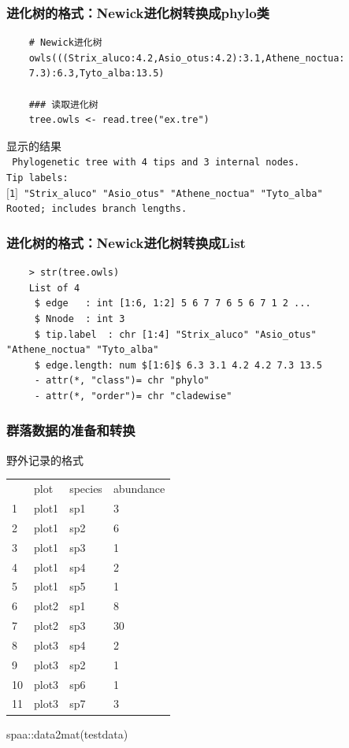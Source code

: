 \documentclass[UTF8]{ctexbeamer}
\begin{document}
    \begin{frame}[fragile]
    \frametitle{进化树的格式：Newick进化树转换成phylo类}
    \begin{verbatim}
    # Newick进化树
    owls(((Strix_aluco:4.2,Asio_otus:4.2):3.1,Athene_noctua:
    7.3):6.3,Tyto_alba:13.5)
    
    ### 读取进化树
    tree.owls <- read.tree("ex.tre")
    \end{verbatim}
    
    显示的结果\\
    {\tt 
    Phylogenetic tree with 4 tips and 3 internal nodes.\\
    
    Tip labels:\\
    $[$1$]$ "Strix\_aluco"   "Asio\_otus" "Athene\_noctua" "Tyto\_alba"   \\ 
    
    Rooted; includes branch lengths.}\\
    
    \end{frame}
    
    \begin{frame}[fragile]
    \frametitle{进化树的格式：Newick进化树转换成List}
     \begin{verbatim}
    > str(tree.owls)
    List of 4
     $ edge   : int [1:6, 1:2] 5 6 7 7 6 5 6 7 1 2 ...
     $ Nnode  : int 3
     $ tip.label  : chr [1:4] "Strix_aluco" "Asio_otus" "Athene_noctua" "Tyto_alba"
     $ edge.length: num $[1:6]$ 6.3 3.1 4.2 4.2 7.3 13.5
     - attr(*, "class")= chr "phylo"
     - attr(*, "order")= chr "cladewise"
    \end{verbatim}
    \end{frame}
    

\begin{frame}
\frametitle{群落数据的准备和转换}
野外记录的格式
 \begin{center}
\begin{tabular}{llll} 
&plot & species &  abundance\\
1& plot1 &  sp1&3\\
2& plot1 &  sp2&6\\
3& plot1 &  sp3&1\\
4& plot1 &  sp4&2\\
5& plot1 &  sp5&1\\
6& plot2 &  sp1&8\\
7& plot2 &  sp3&   30\\
8& plot3 &  sp4&2\\
9& plot3 &  sp2&1\\
10   & plot3 &  sp6&1\\
11   & plot3 &  sp7&3\\
\end{tabular}
\end{center}
spaa::data2mat(testdata)
\end{frame}
\end{document}
